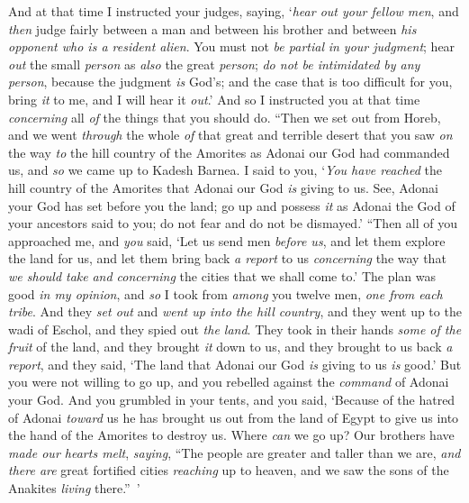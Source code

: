 \begin{biblechapter}
\verse And at that time I instructed your judges, saying, ‘\textit{hear out your fellow men}, and \textit{then} judge fairly between a man and between his brother and between \textit{his opponent who is a resident alien}.
\verse You must not \textit{be partial} \textit{in your judgment};  hear \textit{out} the small \textit{person} as \textit{also} the great \textit{person}; \textit{do not be intimidated by any person}, because the judgment \textit{is} God’s; and the case that is too difficult for you, bring \textit{it} to me, and I will hear it \textit{out}.’
\verse And so I instructed you at that time \textit{concerning} all \textit{of} the things that you should do.
\verse “Then we set out from Horeb, and we went \textit{through} the whole \textit{of} that great and terrible desert that you saw \textit{on} the way \textit{to} the hill country of the Amorites as Adonai our God had commanded us, and \textit{so} we came up to Kadesh Barnea.
\verse I said to you, ‘\textit{You have reached} the hill country of the Amorites that Adonai our God \textit{is} giving to us.
\verse See, Adonai your God has set before you the land; go up and possess \textit{it} as Adonai the God of your ancestors said to you; do not fear and do not be dismayed.’
\verse “Then all of you approached me, and \textit{you} said, ‘Let us send men \textit{before us}, and let them explore the land for us, and let them bring back \textit{a report} to us \textit{concerning} the way that \textit{we should take} \textit{and concerning} the cities that we shall come to.’
\verse The plan was good \textit{in my opinion}, and \textit{so} I took from \textit{among} you twelve men, \textit{one from each tribe}.
\verse And they \textit{set out} and \textit{went up into the hill country}, and they went up to the wadi of Eschol, and they spied out \textit{the land}.
\verse They took in their hands \textit{some of the fruit} of the land, and they brought \textit{it} down to us, and they brought to us back \textit{a report}, and they said, ‘The land that Adonai our God \textit{is} giving to us \textit{is} good.’
\verse But you were not willing to go up, and you rebelled against the \textit{command} of Adonai your God.
\verse And you grumbled in your tents, and you said, ‘Because of the hatred of Adonai \textit{toward} us he has brought us out from the land of Egypt to give us into the hand of the Amorites to destroy us.
\verse Where \textit{can} we go up? Our brothers have \textit{made our hearts melt}, \textit{saying}, “The people are greater and taller than we are, \textit{and there are} great fortified cities \textit{reaching} up to heaven, and we saw the sons of the Anakites \textit{living} there.” ’

\end{biblechapter}
